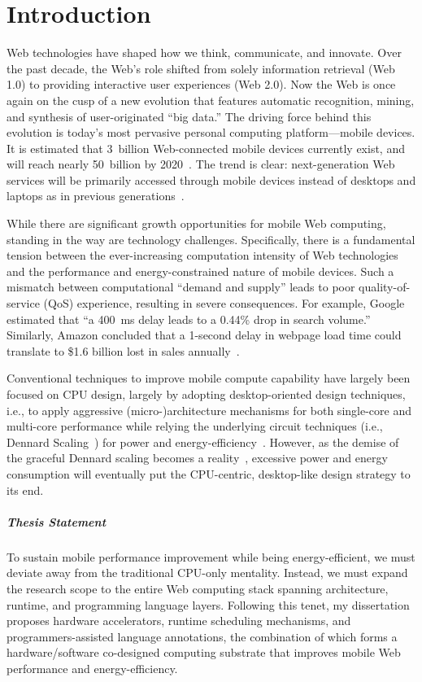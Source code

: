 
\chapter{Introduction}
\label{sec:intro}

Web technologies have shaped how we think, communicate, and innovate. Over the past decade, the Web's role shifted from solely information retrieval (Web 1.0) to providing interactive user experiences (Web 2.0). Now the Web is once again on the cusp of a new evolution that features automatic recognition, mining, and synthesis of user-originated ``big data.'' The driving force behind this evolution is today's most pervasive personal computing platform---mobile devices. It is estimated that 3~billion Web-connected mobile devices currently exist, and will reach nearly 50~billion by 2020~\cite{Evans:2011ys}. The trend is clear: next-generation Web services will be primarily accessed through mobile devices instead of desktops and laptops as in previous generations~\cite{KPCB-Internet-Trends15}.

While there are significant growth opportunities for mobile Web computing, standing in the way are technology challenges. Specifically, there is a fundamental tension between the ever-increasing computation intensity of Web technologies and the performance and energy-constrained nature of mobile devices. Such a mismatch between computational ``demand and supply'' leads to poor quality-of-service (QoS) experience, resulting in severe consequences. For example, Google estimated that ``a 400~ms delay leads to a 0.44\% drop in search volume.''~\cite{web:google} Similarly, Amazon concluded that a 1-second delay in webpage load time could translate to \$1.6 billion lost in sales annually~\cite{Eaton:2013uq}.

Conventional techniques to improve mobile compute capability have largely been focused on CPU design, largely by adopting desktop-oriented design techniques, i.e., to apply aggressive (micro-)architecture mechanisms for both single-core and multi-core performance while relying the underlying circuit techniques (i.e., Dennard Scaling~\cite{dennard}) for power and energy-efficiency~\cite{mobilecpu}. However, as the demise of the graceful Dennard scaling becomes a reality~\cite{darksilicon}, excessive power and energy consumption will eventually put the CPU-centric, desktop-like design strategy to its end.

\paragraph{Thesis Statement} To sustain mobile performance improvement while being energy-efficient, we must deviate away from the traditional CPU-only mentality. Instead, we must expand the research scope to the entire Web computing stack spanning architecture, runtime, and programming language layers. Following this tenet, my dissertation proposes hardware accelerators, runtime scheduling mechanisms, and programmers-assisted language annotations, the combination of which forms a hardware/software co-designed computing substrate that improves mobile Web performance and energy-efficiency.

